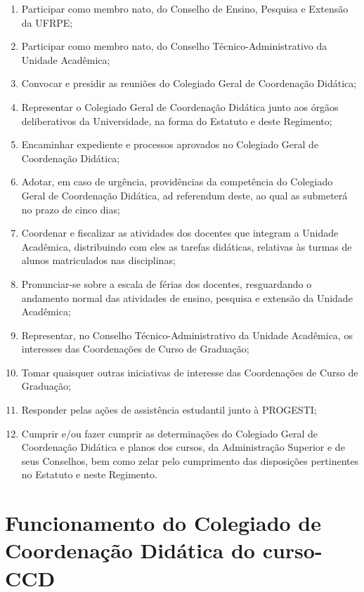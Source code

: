 \documentclass[
	12pt,				%
	openright,			%
  oneside,     %
	a4paper,			%
 hyphens,
	chapter=TITLE,		%
	english,			%
	french,				%
	spanish,			%
	brazil				%
	]{abntex2}
\begin{document}
\begin{enumerate}
    \item Participar como membro nato, do Conselho de Ensino, Pesquisa e Extensão da UFRPE;
    \item Participar como membro nato, do Conselho Técnico-Administrativo da Unidade Acadêmica;
    \item Convocar e presidir as reuniões do Colegiado Geral de Coordenação Didática;
    \item Representar o Colegiado Geral de Coordenação Didática junto aos órgãos deliberativos da Universidade, na forma do Estatuto e deste Regimento;
    \item Encaminhar expediente e processos aprovados no Colegiado Geral de Coordenação Didática;
    \item Adotar, em caso de urgência, providências da competência do Colegiado Geral de Coordenação Didática, ad referendum deste, ao qual as submeterá no prazo de cinco dias;
    \item Coordenar e fiscalizar as atividades dos docentes que integram a Unidade Acadêmica, distribuindo com eles as tarefas didáticas, relativas às turmas de alunos matriculados nas disciplinas;
    \item Pronunciar-se sobre a escala de férias dos docentes, resguardando o andamento normal das atividades de ensino, pesquisa e extensão da Unidade Acadêmica;
    \item Representar, no Conselho Técnico-Administrativo da Unidade Acadêmica, os  interesses das Coordenações de Curso de Graduação;
    \item Tomar quaisquer outras iniciativas de interesse das Coordenações de Curso de Graduação;
    \item Responder pelas ações de assistência estudantil junto à PROGESTI;
    \item Cumprir e/ou fazer cumprir as determinações do Colegiado Geral de Coordenação Didática e planos dos cursos, da Administração Superior e de seus Conselhos, bem como zelar pelo cumprimento das disposições pertinentes no Estatuto e neste Regimento.
\end{enumerate}

\section{Funcionamento do Colegiado de Coordenação Didática do curso- \acrfull{CCD}}
\end{document}
